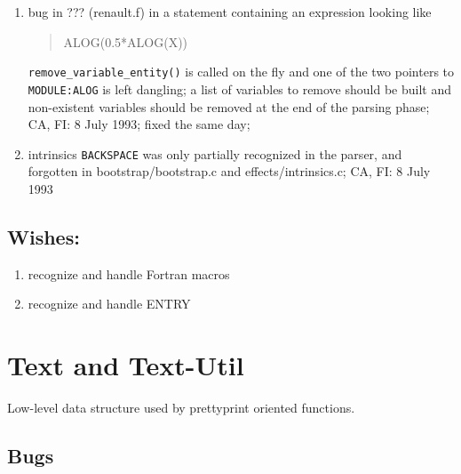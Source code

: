 \begin{enumerate}
  \item bug in ??? (renault.f) in a statement containing an expression looking like
\begin{quote}
ALOG(0.5*ALOG(X))
\end{quote}
	\verb+remove_variable_entity()+ is called on the fly and one of
	the two pointers to \verb+MODULE:ALOG+ is left dangling; a list
	of variables to remove should be built and non-existent
	variables should be removed at the end of the parsing phase;
	CA, FI: 8 July 1993; fixed the same day;

  \item intrinsics \verb+BACKSPACE+ was only partially recognized in the
	parser, and forgotten in bootstrap/bootstrap.c and
	effects/intrinsics.c; CA, FI: 8 July 1993
	

\end{enumerate}

\subsection{Wishes:}

\begin{enumerate}

  \item recognize and handle Fortran macros

  \item recognize and handle ENTRY

\end{enumerate}

\section{Text and Text-Util}

Low-level data structure used by prettyprint oriented functions.

\subsection{Bugs}

